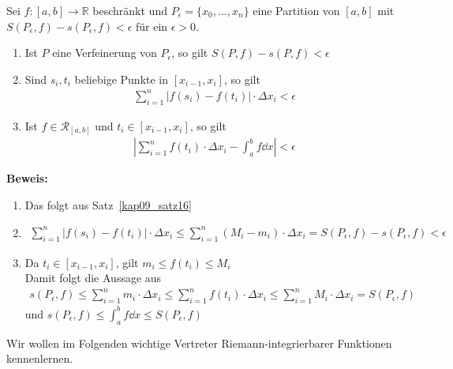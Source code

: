 \begin{Satz}{\label{kap10_satz19}
	Sei $f:[a,b] \rightarrow \mathbb{R}$ beschränkt und $P_{\epsilon} = 
	\{x_0, \hdots, x_n\}$ eine Partition von $[a,b]$ mit $S(P_{\epsilon},f) -
	s(P_{\epsilon},f) < \epsilon$ für ein $\epsilon > 0$.
	\begin{enumerate}
		\item Ist $P$ eine Verfeinerung von $P_{\epsilon}$, so gilt 
		$S(P,f) - s(P,f) < \epsilon$
		\item Sind $s_i, t_i$ beliebige Punkte in $[x_{i-1},x_i]$, so gilt 
		\begin{align*}
			\sum_{i=1}^n \left\vert f(s_i) - f(t_i) \right\vert \cdot 
			\Delta x_i < \epsilon
		\end{align*}
		\item Ist $f \in \mathcal{R}_{[a,b]}$ und $t_i \in [x_{i-1},x_i]$, so 
		gilt 
		\begin{align*}
			\left\vert \sum_{i=1}^n f(t_i) \cdot \Delta x_i - \int_a^b f \dd{x} 
			\right\vert < \epsilon
		\end{align*}
	\end{enumerate}	 
	\textbf{Beweis:}
	\begin{enumerate}
		\item Das folgt aus Satz~\ref{kap09_satz16}
		
		\item
		 \begin{align*}
			\sum_{i = 1}^n \left\vert f(s_i) - f(t_i) \right\vert	\cdot 
			\Delta x_i \leq \sum_{i=1}^n (M_i-m_i)\cdot \Delta x_i
			= S(P_{\epsilon},f) - s(P_{\epsilon},f) < \epsilon
		 \end{align*}
		 \item Da $t_i \in [x_{i-1},x_i]$, gilt $m_i \leq f(t_i) \leq M_i$ \\
		 	Damit folgt die Aussage aus
			 \begin{align*}
			 	s(P_{\epsilon},f ) \leq  
			 	\sum_{i = 1}^n m_i \cdot \Delta x_i \leq \sum_{i=1}^n f(t_i) \cdot \Delta 
			 	x_i \leq \sum_{i=1}^n M_i \cdot \Delta x_i = S(P_{\epsilon},f)
			 \end{align*}
			 und $s(P_{\epsilon},f) \leq \int_a^b f \dd{x} \leq S(P_{\epsilon},f)$
	\end{enumerate}
	Wir wollen im Folgenden wichtige Vertreter Riemann-integrierbarer 
	Funktionen kennenlernen.
}\end{Satz}

